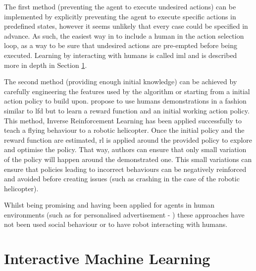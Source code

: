 	The first method (preventing the agent to execute undesired actions) can be implemented by explicitly preventing the agent to execute specific actions in predefined states, however it seems unlikely that every case could be specified in advance. As such, the easiest way in to include a human in the action selection loop, as a way to be sure that undesired actions are pre-empted before being executed. Learning by interacting with humans is called \acrlong{iml} and is described more in depth in Section \ref{sec:back_iml}.
	
	The second method (providing enough initial knowledge) can be achieved by carefully engineering the features used by the algorithm or starting from a initial action policy to build upon. \cite{Abbeel2004} propose to use humans demonstrations in a fashion similar to \gls{lfd} but to learn a reward function and an initial working action policy. This method, Inverse Reinforcement Learning has been applied successfully to teach a flying behaviour to a robotic helicopter. Once the initial policy and the reward function are estimated, \gls{rl} is applied around the provided policy to explore and optimise the policy. That way, authors can ensure that only small variation of the policy will happen around the demonstrated one. This small variations can ensure that policies leading to incorrect behaviours can be negatively reinforced and avoided before creating issues (such as crashing in the case of the robotic helicopter).
	
	
	Whilst being promising and having been applied for agents in human environments (such as for personalised advertisement - \citealt{theocharous2015personalized})	these approaches have not been used social behaviour or to have robot interacting with humans.

\section{Interactive Machine Learning} \label{sec:back_iml}

